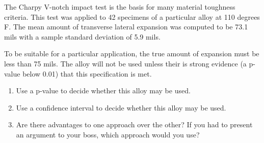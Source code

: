 \documentclass[twoside]{book}\usepackage[]{graphicx}\usepackage[]{xcolor}
\begin{document}
\begin{problem}
	The Charpy V-notch impact test is the basis for many material toughness criteria.
	This test was applied to 42 specimens of a particular alloy at 110 degrees F.
	The mean amount of transverse lateral expansion was computed to be
	73.1 mils with a sample standard deviation of 5.9 mils.

	To be suitable for a particular application, the true amount of expansion must be less than 75 mils.
	The alloy will not be used unless their is strong evidence (a p-value below 0.01) that 
	this specification is met.

	\begin{enumerate}
		\item
			Use a p-value to decide whether this alloy may be used.
		\item
			Use a confidence interval to decide whether this alloy may be used.
		\item
			Are there advantages to one approach over the other?  If you had to present
			an argument to your boss, which approach would you use?
	\end{enumerate}
\end{problem}
\end{document}
